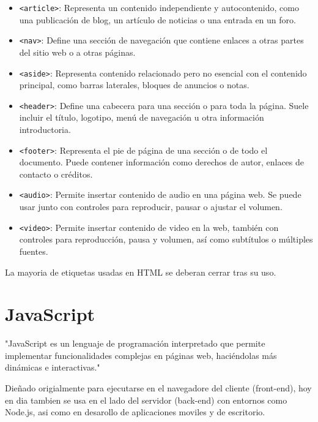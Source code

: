 \documentclass[a4paper, 12pt]{book}
\let\cleardoublepage\clearpage
\begin{document}
\begin{itemize}
  \item \texttt{<article>}: Representa un contenido independiente y autocontenido, como una publicación de blog, un artículo de noticias o una entrada en un foro.

  \item \texttt{<nav>}: Define una sección de navegación que contiene enlaces a otras partes del sitio web o a otras páginas.

  \item \texttt{<aside>}: Representa contenido relacionado pero no esencial con el contenido principal, como barras laterales, bloques de anuncios o notas.

  \item \texttt{<header>}: Define una cabecera para una sección o para toda la página. Suele incluir el título, logotipo, menú de navegación u otra información introductoria.

  \item \texttt{<footer>}: Representa el pie de página de una sección o de todo el documento. Puede contener información como derechos de autor, enlaces de contacto o créditos.

  \item \texttt{<audio>}: Permite insertar contenido de audio en una página web. Se puede usar junto con controles para reproducir, pausar o ajustar el volumen.

  \item \texttt{<video>}: Permite insertar contenido de video en la web, también con controles para reproducción, pausa y volumen, así como subtítulos o múltiples fuentes.
\end{itemize}

La mayoria de etiquetas usadas en HTML se deberan cerrar tras su uso.
\cleardoublepage
\section{JavaScript} 
\label{sec:seccion7}

"JavaScript es un lenguaje de programación interpretado que permite implementar funcionalidades complejas en páginas web, haciéndolas más dinámicas e interactivas." \cite{mdn_javascript_intro_es}

Dieñado origialmente para ejecutarse en el navegadore del cliente (front-end), hoy en dia tambien se usa en el lado del servidor (back-end) con entornos como Node.js, asi como en desarollo de aplicaciones moviles y de escritorio.
\end{document}
